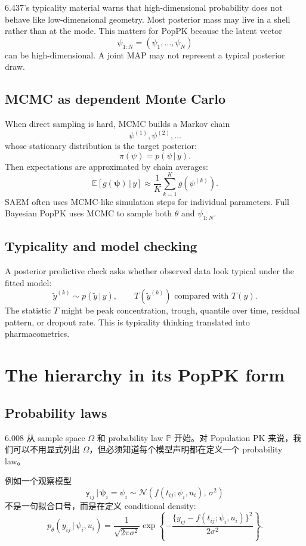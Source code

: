 \documentclass[a4paper]{article}
\newcommand{\rv}[1]{\mathsf{#1}}
\newcommand{\rpsi}{\boldsymbol{\psi}}
\newcommand{\given}{\,|\,}
\newcommand{\Prob}{\mathbb{P}}
\newcommand{\E}{\mathbb{E}}
\newcommand{\Normal}{\mathcal{N}}
\begin{document}
6.437's typicality material warns that high-dimensional probability does not behave like low-dimensional geometry. Most posterior mass may live in a shell rather than at the mode. This matters for PopPK because the latent vector
\[
  \psi_{1:N}=(\psi_1,\ldots,\psi_N)
\]
can be high-dimensional. A joint MAP may not represent a typical posterior draw.

\subsection{MCMC as dependent Monte Carlo}

When direct sampling is hard, MCMC builds a Markov chain
\[
  \psi^{(1)},\psi^{(2)},\ldots
\]
whose stationary distribution is the target posterior:
\[
  \pi(\psi)=p(\psi\given y).
\]
Then expectations are approximated by chain averages:
\[
  \E[g(\rpsi)\given y]
  \approx
  \frac{1}{K}\sum_{k=1}^K g(\psi^{(k)}).
\]
SAEM often uses MCMC-like simulation steps for individual parameters. Full Bayesian PopPK uses MCMC to sample both \(\theta\) and \(\psi_{1:N}\).

\subsection{Typicality and model checking}

A posterior predictive check asks whether observed data look typical under the fitted model:
\[
  \tilde y^{(k)}\sim p(\tilde y\given y),
  \qquad
  T(\tilde y^{(k)}) \text{ compared with } T(y).
\]
The statistic \(T\) might be peak concentration, trough, quantile over time, residual pattern, or dropout rate. This is typicality thinking translated into pharmacometrics.

\section{The hierarchy in its PopPK form}

\subsection{Probability laws}

6.008 从 sample space \(\Omega\) 和 probability law \(\Prob\) 开始。对 Population PK 来说，我们可以不用显式列出 \(\Omega\)，但必须知道每个模型声明都在定义一个 probability law。

例如一个观察模型
\[
  \rv{y}_{ij}\given \rpsi_i=\psi_i
  \sim
  \Normal\!\left(f(t_{ij};\psi_i,u_i),\,\sigma^2\right)
\]
不是一句拟合口号，而是在定义 conditional density:
\[
  p_\theta(y_{ij}\given \psi_i,u_i)
  =
  \frac{1}{\sqrt{2\pi\sigma^2}}
  \exp\left\{
    -\frac{\{y_{ij}-f(t_{ij};\psi_i,u_i)\}^2}{2\sigma^2}
  \right\}.
\]
\end{document}
